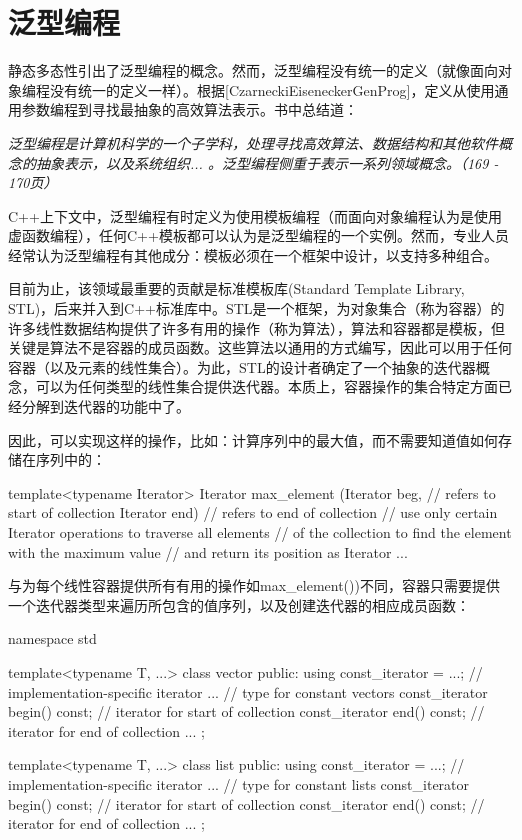 \section{泛型编程}
静态多态性引出了泛型编程的概念。然而，泛型编程没有统一的定义（就像面向对象编程没有统一的定义一样）。根据[CzarneckiEiseneckerGenProg]，定义从使用通用参数编程到寻找最抽象的高效算法表示。书中总结道：

\textit{泛型编程是计算机科学的一个子学科，处理寻找高效算法、数据结构和其他软件概念的抽象表示，以及系统组织... 。泛型编程侧重于表示一系列领域概念。（169 - 170页）}

C++上下文中，泛型编程有时定义为使用模板编程（而面向对象编程认为是使用虚函数编程），任何C++模板都可以认为是泛型编程的一个实例。然而，专业人员经常认为泛型编程有其他成分：模板必须在一个框架中设计，以支持多种组合。

目前为止，该领域最重要的贡献是标准模板库(Standard Template Library, STL)，后来并入到C++标准库中。STL是一个框架，为对象集合（称为容器）的许多线性数据结构提供了许多有用的操作（称为算法），算法和容器都是模板，但关键是算法不是容器的成员函数。这些算法以通用的方式编写，因此可以用于任何容器（以及元素的线性集合）。为此，STL的设计者确定了一个抽象的迭代器概念，可以为任何类型的线性集合提供迭代器。本质上，容器操作的集合特定方面已经分解到迭代器的功能中了。

因此，可以实现这样的操作，比如：计算序列中的最大值，而不需要知道值如何存储在序列中的：

\begin{cpp}
template<typename Iterator>
Iterator max_element (Iterator beg, // refers to start of collection
					  Iterator end) { // refers to end of collection
	// use only certain Iterator operations to traverse all elements
	// of the collection to find the element with the maximum value
	// and return its position as Iterator
	...
}
\end{cpp}

与为每个线性容器提供所有有用的操作如max\_element())不同，容器只需要提供一个迭代器类型来遍历所包含的值序列，以及创建迭代器的相应成员函数：

\begin{cpp}
namespace std {
	template<typename T, ...>
	class vector {
		public:
		using const_iterator = ...; // implementation-specific iterator
		... // type for constant vectors
		const_iterator begin() const; // iterator for start of collection
		const_iterator end() const; // iterator for end of collection
		...
	};

	template<typename T, ...>
	class list {
		public:
		using const_iterator = ...; // implementation-specific iterator
		... // type for constant lists
		const_iterator begin() const; // iterator for start of collection
		const_iterator end() const; // iterator for end of collection
		...
	};
}
\end{cpp}

